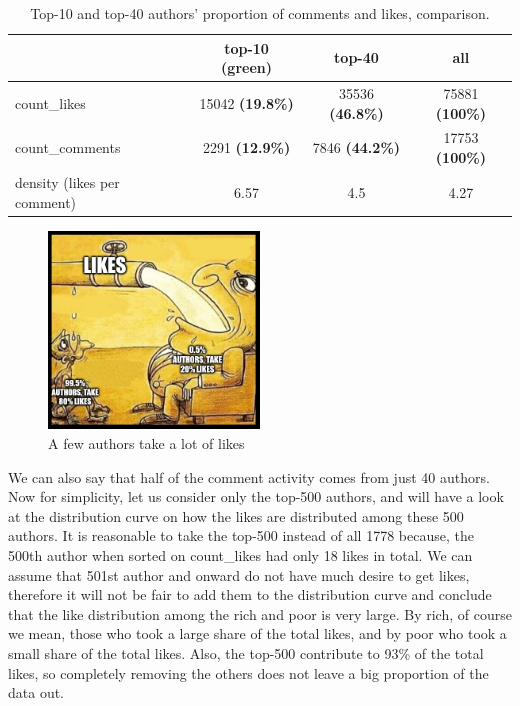 \documentclass[
	12pt
] {article}
\begin{document}
	\begin{table}[H]
		\centering
		\caption{Top-10 and top-40 authors' proportion of comments and likes, comparison.}
		\label{table:basic-stats-number-likes-comments-author}
		\begin{tabular}{| p{5cm} | c | c | c |} %
			\hline
			 & top-10 (green) & top-40 & all \\
			\hline
			count\_likes &
				\num{15042} \textbf{(\num{19.8}\%)} &
				\num{35536} \textbf{(\num{46.8}\%)} &
				\num{75881} \textbf{(\num{100}\%)} \\
			count\_comments &
				\num{2291} \textbf{(\num{12.9}\%)} &
				\num{7846} \textbf{(\num{44.2}\%)} &
				\num{17753} \textbf{(\num{100}\%)} \\
			density (likes per comment) &
				\num{6.57} &
				\num{4.5} &
				\num{4.27} \\
			\hline
		\end{tabular}
	\end{table}

	\begin{figure}[H]
		\centering
		\includegraphics[width=0.5\textwidth]{fig-small-author-take-almost-all-likes}
		\caption{A few authors take a lot of likes}
		\label{fig-small-author-take-almost-all-likes}
	\end{figure}

	We can also say that half of the comment activity comes from just 40 authors. Now for simplicity, let us consider only the top-500 authors, and will have a look at the distribution curve on how the likes are distributed among these 500 authors. It is reasonable to take the top-500 instead of all \num{1778} because, the 500th author when sorted on count\_likes had only 18 likes in total. We can assume that 501st author and onward do not have much desire to get likes, therefore it will not be fair to add them to the distribution curve and conclude that the like distribution among the rich and poor is very large. By rich, of course we mean, those who took a large share of the total likes, and by poor who took a small share of the total likes. Also, the top-500 contribute to \num{93}\% of the total likes, so completely removing the others does not leave a big proportion of the data out.
\end{document}
